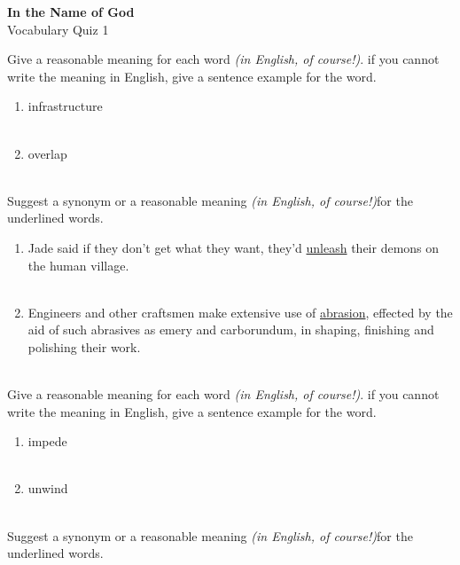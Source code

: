 \documentclass{exam}
\begin{document}
\begin{center}
\textbf{In the Name of God}\\ 
Vocabulary Quiz 1
\end{center}
\vspace{5mm}
\begin{questions}
\question Give a reasonable meaning for each word \emph{(in English, of course!)}. if you cannot write the meaning in English, give a sentence example for the word.\\
\begin{enumerate}
	\item infrastructure\\ \\
	\item overlap \\ \\
\end{enumerate}
\question Suggest a synonym or a reasonable meaning \emph{(in English, of course!)}for the underlined words.\\
\begin{enumerate}
	\item Jade said if they don't get what they want, they'd \underline{unleash} their demons on the human village.\\ \\
	\item Engineers and other craftsmen make extensive use of \underline{abrasion}, effected by the aid of such abrasives as emery and carborundum, in shaping, finishing and polishing their work.\\ \\
\end{enumerate}
\question Give a reasonable meaning for each word \emph{(in English, of course!)}. if you cannot write the meaning in English, give a sentence example for the word.\\
\begin{enumerate}
	\item impede \\ \\
	\item unwind \\ \\
\end{enumerate}
\question Suggest a synonym or a reasonable meaning \emph{(in English, of course!)}for the underlined words.\\
\begin{enumerate}

\end{enumerate}
\end{questions}
\end{document}
